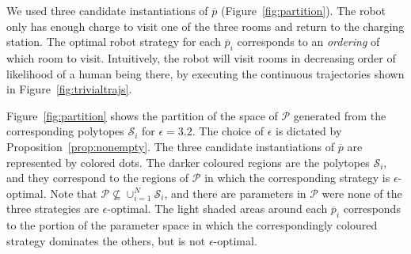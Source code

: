  


We used three candidate instantiations of $\overline{p}$ (Figure~\ref{fig:partition}). The robot only has enough charge to visit one of the three rooms and return to the charging station. The optimal robot strategy for each $\overline p_i$ corresponds to an \emph{ordering} of which room to visit. Intuitively, the robot will visit rooms in decreasing order of likelihood of a human being there, by executing the continuous trajectories shown in Figure~\ref{fig:trivialtrajs}. 


Figure~\ref{fig:partition} shows the partition of the space of $\mathcal{P}$ generated from the corresponding polytopes $\mathcal{S}_i$ for $\epsilon = 3.2$. The choice of $\epsilon$ is dictated by Proposition~\ref{prop:nonempty}. The three candidate instantiations of $\overline{p}$ are represented by colored dots. The darker coloured regions are the polytopes $\mathcal{S}_i$, and they correspond to the regions of $\mathcal{P}$ in which the corresponding strategy is $\epsilon$-optimal. Note that $\mathcal{P}\not\subseteq\cup_{i=1}^N\mathcal{S}_i$, and there are parameters in $\mathcal{P}$ were none of the three strategies are $\epsilon$-optimal. The light shaded areas around each $\overline{p}_i$ corresponds to the portion of the parameter space in which the correspondingly coloured strategy dominates the others, but is not $\epsilon$-optimal.


